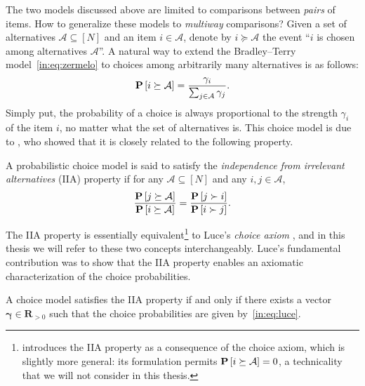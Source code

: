 The two models discussed above are limited to comparisons between \emph{pairs} of items.
How to generalize these models to \emph{multiway} comparisons?
Given a set of alternatives $\mathcal{A} \subseteq [N]$ and an item $i \in \mathcal{A}$, denote by $i \succeq \mathcal{A}$ the event ``$i$ is chosen among alternatives $\mathcal{A}$''.
A natural way to extend the Bradley--Terry model~\eqref{in:eq:zermelo} to choices among arbitrarily many alternatives is as follows:
\begin{align}
\label{in:eq:luce}
\mathbf{P}\left[ i \succeq \mathcal{A} \right] = \frac{\gamma_i}{\sum_{j \in \mathcal{A}} \gamma_j}.
\end{align}
Simply put, the probability of a choice is always proportional to the strength $\gamma_i$ of the item $i$, no matter what the set of alternatives is.
This choice model is due to \citet{luce1959individual}, who showed that it is closely related to the following property.

\begin{definition}
A probabilistic choice model is said to satisfy the \emph{independence from irrelevant alternatives} (IIA) property if for any $\mathcal{A} \subseteq [N]$ and any $i, j \in \mathcal{A}$,
\begin{align*}
\frac{\mathbf{P}\left[ j \succeq \mathcal{A} \right]}{\mathbf{P}\left[ i \succeq \mathcal{A} \right]}
     = \frac{\mathbf{P}\left[ j \succ i \right]}{\mathbf{P}\left[ i \succ j \right]}.
\end{align*}
\end{definition}

The IIA property is essentially equivalent\footnote{%
\citet{luce1959individual} introduces the IIA property as a consequence of the choice axiom, which is slightly more general: its formulation permits $\mathbf{P}\left[ i \succeq \mathcal{A} \right] = 0$, a technicality that we will not consider in this thesis.}
to Luce's \emph{choice axiom} \citeyearpar[p. 6]{luce1959individual}, and in this thesis we will refer to these two concepts interchangeably.
Luce's fundamental contribution was to show that the IIA property enables an axiomatic characterization of the choice probabilities.

\begin{proposition}
A choice model satisfies the IIA property if and only if there exists a vector $\bm{\gamma} \in \mathbf{R}_{>0}$ such that the choice probabilities are given by~\eqref{in:eq:luce}.
\end{proposition}

